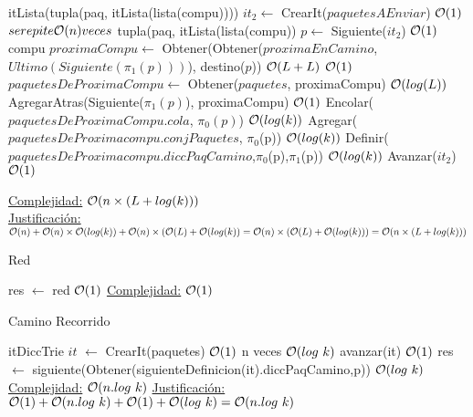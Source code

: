 \begin{Algoritmos}
\begin{algorithm}
\begin{algorithmic}[1]
  \State itLista(tupla(paq, itLista(lista(compu)))) $it_2 \gets$ CrearIt($paquetesAEnviar$) \Comment  $\mathcal{O}(1)$
   \Comment  $se repite \mathcal{O}(n) veces$
      \State tupla(paq, itLista(lista(compu)) $p \gets$ Siguiente($it_2$) \Comment  $\mathcal{O}(1)$
      \State compu $proximaCompu \gets$ Obtener(Obtener($proximaEnCamino$, $Ultimo(Siguiente(\pi_1(p)))$), destino($p$)) 
      \State \Comment  $\mathcal{O}(L + L)$
       \Comment  $\mathcal{O}(1)$
	\State $paquetesDeProximaCompu \gets$ Obtener($paquetes$, proximaCompu) \Comment  $\mathcal{O}(log(L))$
      	\State AgregarAtras(Siguiente($\pi_1(p)$), proximaCompu) \Comment  $\mathcal{O}(1)$
      	\State Encolar($paquetesDeProximaCompu$.$cola$, $\pi_0(p)$) \Comment  $\mathcal{O}(log(k))$
      	\State Agregar($paquetesDeProximacompu$.$conjPaquetes$, $\pi_0$(p)) \Comment  $\mathcal{O}(log(k))$
	\State Definir($paquetesDeProximacompu.diccPaqCamino$,$\pi_0$(p),$\pi_1$(p)) \Comment  $\mathcal{O}(log(k))$
      \EndIf
      \State Avanzar($it_2$) \Comment  $\mathcal{O}(1)$
  \EndWhile
 
 \EndProcedure
 \end{algorithmic}
 \underline{Complejidad:} $\mathcal{O}(n \times (L + log(k)))$\\
 \underline{Justificación:} $\mathcal{O}(n)+\mathcal{O}(n) \times \mathcal{O}(log(k))+\mathcal{O}(n)\times (\mathcal{O}(L) + \mathcal{O}(log(k)) = \mathcal{O}(n) \times (\mathcal{O}(L) + \mathcal{O}(log(k)))=
 \mathcal{O}(n \times (L + log(k)))$
\end{algorithm}



\begin{algorithm}
\caption{Red}
\begin{algorithmic}[1]
 \State res $\gets$ red \Comment $\mathcal{O}(1)$
 \EndProcedure
   \underline{Complejidad:} $\mathcal{O}(1)$
\end{algorithmic}
\end{algorithm}

\begin{algorithm}
\caption{Camino Recorrido}
\begin{algorithmic}[1]
   \State itDiccTrie $it$ $\gets$ CrearIt(paquetes) \Comment $\mathcal{O}(1)$
    \Comment n veces $\mathcal{O}(log \ k)$
   \State avanzar(it) \Comment $\mathcal{O}(1)$
   \EndWhile
   \State res $\gets$ siguiente(Obtener(siguienteDefinicion(it).diccPaqCamino,p)) \Comment $\mathcal{O}(log \ k)$
  \EndProcedure
   \underline{Complejidad:} $\mathcal{O}(n.log \ k)$
 \underline{Justificación:} $\mathcal{O}(1)+\mathcal{O}(n.log \ k)+\mathcal{O}(1)+\mathcal{O}(log \ k) = \mathcal{O}(n.log \ k)$
\end{algorithmic}
\end{algorithm}



\end{Algoritmos}
